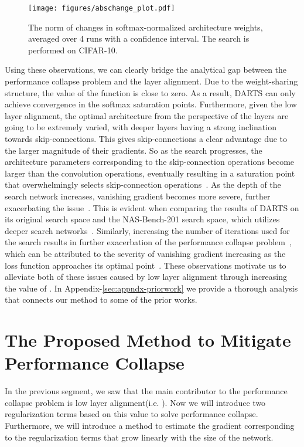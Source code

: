 \documentclass{article} \usepackage{fancyhdr, iclr2023_conference, times}
\newcommand{\lambdafn}{layer alignment\xspace}
\begin{document}
\par \begin{wrapfigure}{r}{0.4\textwidth}
  \vspace{-23pt}
  \begin{center}
    \texttt{[image: figures/abschange\_plot.pdf]}
  \end{center}
  \vspace{-15pt}
  \caption{The  norm of changes in softmax-normalized architecture weights, averaged over 4 runs with a  confidence interval. The search is performed on CIFAR-10.}
  \vspace{-10pt}
  \label{fig:abschange}
\end{wrapfigure}Using these observations, we can clearly bridge the analytical gap between the performance collapse problem and the \lambdafn. Due to the weight-sharing structure, the value of the function  is close to zero. As a result, DARTS can only achieve convergence in the softmax saturation points. Furthermore, given the low \lambdafn, the optimal architecture from the perspective of the layers are going to be extremely varied, with deeper layers having a strong inclination towards skip-connections. This gives skip-connections a clear advantage due to the larger magnitude of their gradients. So as the search progresses, the architecture parameters corresponding to the skip-connection operations become larger than the convolution operations, eventually resulting in a saturation point that overwhelmingly selects skip-connection operations~\citep{DBLP:journals/corr/abs-1910-11831, DBLP:conf/iclr/ChuW0LWY21}. As the depth of the search network increases, vanishing gradient becomes more severe, further exacerbating the issue~\citep{DBLP:conf/cvpr/HeZRS16}. This is evident when comparing the results of DARTS on its original search space and the NAS-Bench-201 search space, which utilizes deeper search networks~\citep{DBLP:conf/iclr/Dong020}. Similarly, increasing the number of iterations used for the search results in further exacerbation of the performance collapse problem~\citep{DBLP:journals/corr/abs-1910-11831}, which can be attributed to the severity of vanishing gradient increasing as the loss function approaches its optimal point~\citep{DBLP:conf/cvpr/HeZRS16}. These observations motivate us to alleviate both of these issues caused by low \lambdafn through increasing the value of . In Appendix-\ref{sec:appndx-priorwork} we provide a thorough analysis that connects our method to some of the prior works.
\section{The Proposed Method to Mitigate Performance Collapse}
In the previous segment, we saw that the main contributor to the performance collapse problem is low \lambdafn (i.e. ). Now we will introduce two regularization terms based on this value to solve performance collapse. Furthermore, we will introduce a method to estimate the gradient corresponding to the regularization terms that grow linearly with the size of the network.
\end{document}
